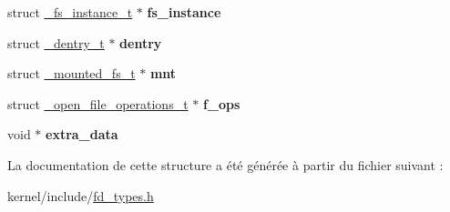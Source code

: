 \begin{DoxyCompactItemize}
\item 
\hypertarget{struct__open__file__descriptor_a032a031b6293ba41fff7652cad4c507e}{struct \hyperlink{struct__fs__instance__t}{\-\_\-fs\-\_\-instance\-\_\-t} $\ast$ {\bfseries fs\-\_\-instance}}\label{struct__open__file__descriptor_a032a031b6293ba41fff7652cad4c507e}

\item 
\hypertarget{struct__open__file__descriptor_a3b375ad15f7bcb8e92123bd1a17765f3}{struct \hyperlink{struct__dentry__t}{\-\_\-dentry\-\_\-t} $\ast$ {\bfseries dentry}}\label{struct__open__file__descriptor_a3b375ad15f7bcb8e92123bd1a17765f3}

\item 
\hypertarget{struct__open__file__descriptor_a65408e330b7a3763de5549c826564730}{struct \hyperlink{struct__mounted__fs__t}{\-\_\-mounted\-\_\-fs\-\_\-t} $\ast$ {\bfseries mnt}}\label{struct__open__file__descriptor_a65408e330b7a3763de5549c826564730}

\item 
\hypertarget{struct__open__file__descriptor_a6cd707cf9a5d837feba5ef2a2f91bfcd}{struct \hyperlink{struct__open__file__operations__t}{\-\_\-open\-\_\-file\-\_\-operations\-\_\-t} $\ast$ {\bfseries f\-\_\-ops}}\label{struct__open__file__descriptor_a6cd707cf9a5d837feba5ef2a2f91bfcd}

\item 
\hypertarget{struct__open__file__descriptor_a99824795a31a8adea2162aed74162017}{void $\ast$ {\bfseries extra\-\_\-data}}\label{struct__open__file__descriptor_a99824795a31a8adea2162aed74162017}

\end{DoxyCompactItemize}


\-La documentation de cette structure a été générée à partir du fichier suivant \-:\begin{DoxyCompactItemize}
\item 
kernel/include/\hyperlink{fd__types_8h}{fd\-\_\-types.\-h}\end{DoxyCompactItemize}
